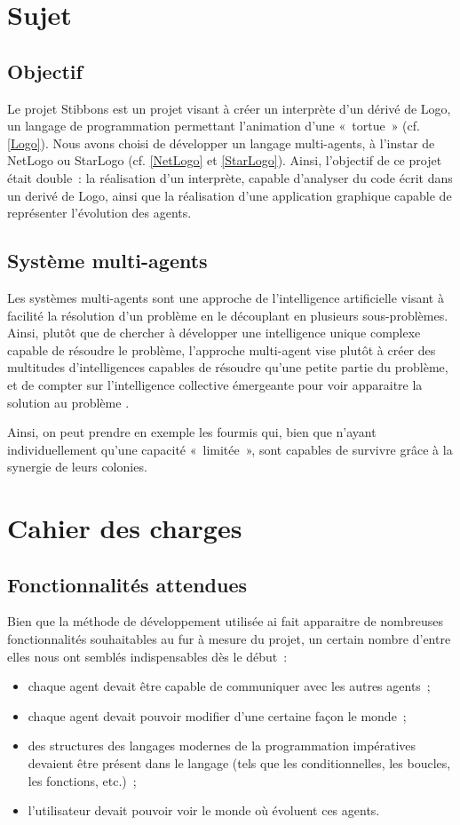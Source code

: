 \section{Sujet}
	\subsection{Objectif}
	Le projet Stibbons est un projet visant à créer un interprète d'un dérivé de Logo, un langage de programmation permettant l'animation d'une «~tortue~» (cf. \ref{Logo}). Nous avons choisi de développer un langage multi-agents, à l'instar de NetLogo ou StarLogo (cf. \ref{NetLogo} et \ref{StarLogo}). Ainsi, l'objectif de ce projet était double~: la réalisation d'un interprète, capable d'analyser du code écrit dans un derivé de Logo, ainsi que la réalisation d'une application graphique capable de représenter l'évolution des agents.

	\subsection{Système multi-agents}
	Les systèmes multi-agents sont une approche de l'intelligence artificielle visant à facilité la résolution d'un problème en le découplant en plusieurs sous-problèmes. Ainsi, plutôt que de chercher à développer une intelligence unique complexe capable de résoudre le problème, l'approche multi-agent vise plutôt à créer des multitudes d'intelligences capables de résoudre qu'une petite partie du problème, et de compter sur l'intelligence collective émergeante pour voir apparaitre la solution au problème \cite{sma}.

	Ainsi, on peut prendre en exemple les fourmis qui, bien que n'ayant individuellement qu'une capacité «~limitée~», sont capables de survivre grâce à la synergie de leurs colonies.

\section{Cahier des charges}
	\subsection{Fonctionnalités attendues}
	Bien que la méthode de développement utilisée ai fait apparaitre de nombreuses fonctionnalités souhaitables au fur à mesure du projet, un certain nombre d'entre elles nous ont semblés indispensables dès le début~:
	\begin{itemize}
		\item chaque agent devait être capable de communiquer avec les autres agents~;
		\item chaque agent devait pouvoir modifier d'une certaine façon le monde~;
		\item des structures des langages modernes de la programmation impératives devaient être présent dans le langage (tels que les conditionnelles, les boucles, les fonctions, etc.)~;
		\item l'utilisateur devait pouvoir voir le monde où évoluent ces agents.
	\end{itemize}

